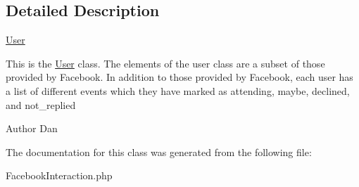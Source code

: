 \subsection{Detailed Description}
\hyperlink{class_user}{User}

This is the \hyperlink{class_user}{User} class. The elements of the user class are a subset of those provided by Facebook. In addition to those provided by Facebook, each user has a list of different events which they have marked as attending, maybe, declined, and not\_\-replied \begin{DoxyAuthor}{Author}
Dan 
\end{DoxyAuthor}


The documentation for this class was generated from the following file:\begin{DoxyCompactItemize}
\item 
FacebookInteraction.php\end{DoxyCompactItemize}
